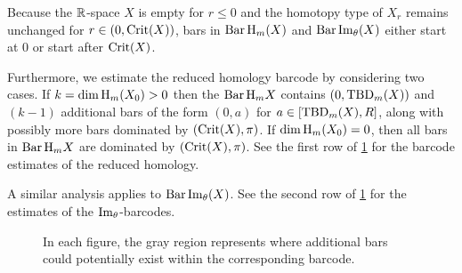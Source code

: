 Because the $\mathbb{R}$-space $X$ is empty for \(r \leq 0\) and the homotopy type of $X_r$ remains unchanged for $r \in (0, \operatorname{Crit}(X))$, bars in \(\operatorname{Bar} \mathrm{H}_m(X)\) and $\operatorname{Bar}\operatorname{Im}_\theta(X)$ either start at $0$ or start after $\operatorname{Crit}(X)$.

Furthermore, we estimate the reduced homology barcode by considering two cases.
If \(k = \dim \operatorname{H}_m(X_0) > 0\) then the $\operatorname{Bar}\mathrm{H}_m X$ contains $(0,\mathrm{TBD}_{m}(X))$ and \((k - 1)\) additional bars of the form \((0, a)\) for \(a \in [\mathrm{TBD}_{m}(X), R]\), along with possibly more bars dominated by \((\operatorname{Crit}(X), \pi)\).
If $\dim \operatorname{H}_m(X_0) = 0$, then all bars in $\operatorname{Bar}\mathrm{H}_m X$ are dominated by \((\operatorname{Crit}(X), \pi)\).
See the first row of \cref{fig:barcodes_general} for the barcode estimates of the reduced homology.

A similar analysis applies to $\operatorname{Bar}\operatorname{Im}_\theta(X)$.
See the second row of \cref{fig:barcodes_general} for the estimates of the $\operatorname{Im}_\theta$-barcodes.

\begin{figure}
	\centering
	
	\caption{In each figure, the gray region represents where additional bars could potentially exist within the corresponding barcode.}
	\label{fig:barcodes_general}
\end{figure}